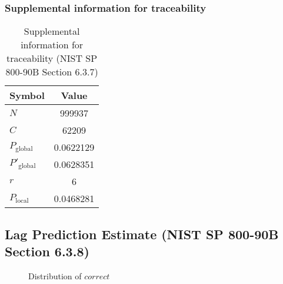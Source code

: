 \documentclass[a3paper,xelatex,english]{bxjsarticle}
\begin{document}
\subsubsection{Supplemental information for traceability}
\renewcommand{\arraystretch}{1.8}
\begin{table}[h]
\caption{Supplemental information for traceability (NIST SP 800-90B Section 6.3.7)}
\begin{center}
\begin{tabular}{|l|c|}
\hline 
\rowcolor{anotherlightblue} %
Symbol				& Value \\ \hline 
$N$				& 999937\\ \hline 
$C$				& 62209\\ \hline 
$P_{\textrm{global}}$				& 0.0622129\\ \hline 
$P'_{\textrm{global}}$			& 0.0628351\\ \hline 
$r$				& 6\\ \hline 
$P_{\textrm{local}}$ 			& 0.0468281\\ \hline
\end{tabular}
\end{center}
\end{table}
\renewcommand{\arraystretch}{1.4}
\clearpage
\subsection{Lag Prediction Estimate (NIST SP 800-90B Section 6.3.8)}
\begin{figure}[htbp]
\caption{Distribution of $correct$}
\end{figure}
\end{document}
